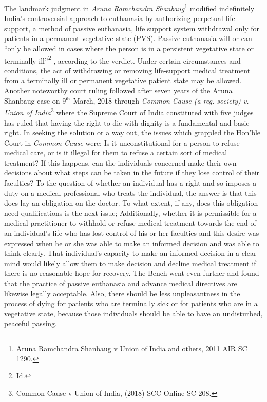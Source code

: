 \setcounter{figure}{0}
\setcounter{table}{0}
\setcounter{footnote}{0}


\begin{multicols}{2}


\noi
The landmark judgment in \textit{Aruna Ramchandra Shanbaug}\footnote{Aruna Ramchandra Shanbaug v Union of India and others, 2011 AIR SC 1290.} modified indefinitely India’s
controversial approach to euthanasia by authorizing perpetual life support, a method of
passive euthanasia, life support system withdrawal only for patients in a permanent
vegetative state (PVS). Passive euthanasia will or can “only be allowed in cases where the
person is in a persistent vegetative state or terminally ill”\footnote{Id.}
, according to the verdict. Under certain circumstances and conditions, the act of withdrawing or removing life-support
medical treatment from a terminally ill or permanent vegetative patient state may be allowed.
Another noteworthy court ruling followed after seven years of the Aruna Shanbaug case on
9$^{\rm th}$ March, 2018 through \textit{Common Cause (a reg. society) v. Union of India}\footnote{Common Cause v Union of India, (2018) SCC Online SC 208.}
 where the Supreme Court of India constituted with five judges has ruled that having the right to die with
dignity is a fundamental and basic right. In seeking the solution or a way out, the issues
which grappled the Hon’ble Court in \textit{Common Cause} were: Is it unconstitutional for a person
to refuse medical care, or is it illegal for them to refuse a certain sort of medical treatment? If
this happens, can the individuals concerned make their own decisions about what steps can be
taken in the future if they lose control of their faculties? To the question of whether an
individual has a right and so imposes a duty on a medical professional who treats the
individual, the answer is that this does lay an obligation on the doctor. To what extent, if any,
does this obligation need qualifications is the next issue; Additionally, whether it is
permissible for a medical practitioner to withhold or refuse medical treatment towards the
end of an individual’s life who has lost control of his or her faculties and this desire was
expressed when he or she was able to make an informed decision and was able to think
clearly. That individual’s capacity to make an informed decision in a clear mind would likely
allow them to make decision and decline medical treatment if there is no reasonable hope for
recovery. The Bench went even further and found that the practice of passive euthanasia and 
advance medical directives are likewise legally acceptable. Also, there should be less
unpleasantness in the process of dying for patients who are terminally sick or for patients
who are in a vegetative state, because those individuals should be able to have an
undisturbed, peaceful passing.


\end{multicols}
